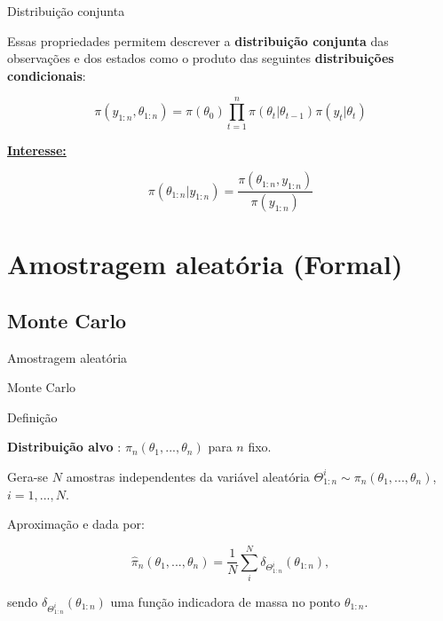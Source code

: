 \documentclass{beamer}
\begin{document}
\begin{frame}{Distribuição conjunta}

Essas propriedades permitem descrever a \textbf{distribuição conjunta} das observações e dos estados como o produto das seguintes \textbf{distribuições condicionais}:

$$
\pi(y_{1:n},\theta_{1:n}) = \pi(\theta_0) \prod_{t=1}^n \pi(\theta_t|\theta_{t-1})\pi(y_t|\theta_t) 
$$

\underline{\textbf{Interesse:}}

$$\pi(\theta_{1:n}|y_{1:n}) =  \frac{\pi(\theta_{1:n},y_{1:n})}{\pi(y_{1:n})} $$


\end{frame}




\section{Amostragem aleatória (Formal)}



\subsection{Monte Carlo}

\begin{frame}{Amostragem aleatória}

    \begin{block}{}
      \Huge  Monte Carlo
    \end{block}


\end{frame}

\begin{frame}{Definição}

\textbf{Distribuição alvo} : $\pi_n(\theta_1,...,\theta_n)$ para $n$ fixo.

\pause
\vspace{0.5cm}

Gera-se $N$ amostras independentes da variável aleatória $\Theta^i_{1:n} \sim \pi_n(\theta_1,...,\theta_n)$, $i=1,...,N$.

\pause
\vspace{0.5cm}

Aproximação e dada por:

$$
\hat{\pi}_n(\theta_1,...,\theta_n) = \frac{1}{N}\sum_i^N \delta_{\Theta^i_{1:n}}(\theta_{1:n}),
$$

\vspace{0.5cm}
sendo $\delta_{\Theta_{1:n}^{i}}(\theta_{1:n})$ uma função indicadora de massa no ponto $\theta_{1:n}$.
\end{frame}
\end{document}

